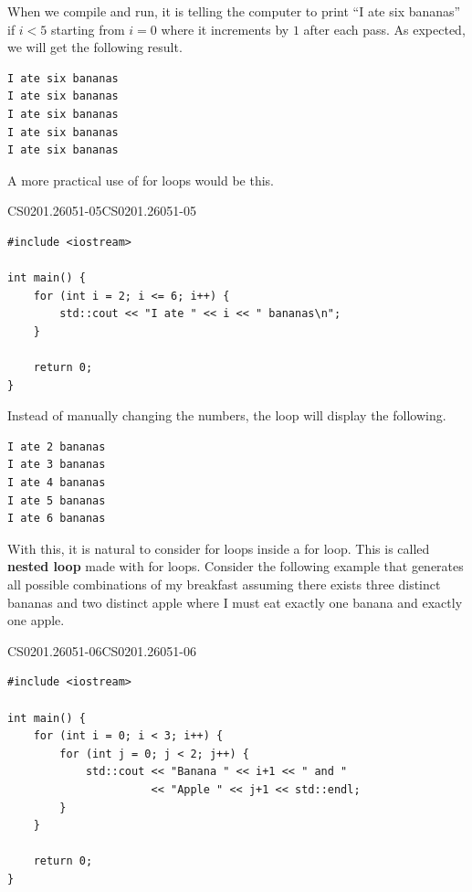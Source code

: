 \documentclass[../../../main.tex]{subfiles}
\begin{document}
When we compile and run, it is telling the computer to print
``I ate six bananas'' if $i < 5$ starting from $i = 0$ where it
increments by $1$ after each pass. As expected, we will get the
following result.

\begin{outputbox}
\begin{lstlisting}[style=basic]
I ate six bananas
I ate six bananas
I ate six bananas
I ate six bananas
I ate six bananas
\end{lstlisting}
\end{outputbox}

A more practical use of for loops would be this.

\begin{cppbox}{CS0201.26051-05}{CS0201.26051-05}
\begin{lstlisting}[style=cppstyle]
#include <iostream>

int main() {
    for (int i = 2; i <= 6; i++) {
        std::cout << "I ate " << i << " bananas\n";
    }

    return 0;
}
\end{lstlisting}
\end{cppbox}

Instead of manually changing the numbers, the loop will display
the following.

\begin{outputbox}
\begin{lstlisting}[style=basic]
I ate 2 bananas
I ate 3 bananas
I ate 4 bananas
I ate 5 bananas
I ate 6 bananas
\end{lstlisting}
\end{outputbox}

With this, it is natural to consider for loops inside a for loop.
This is called \textbf{nested loop} made with for loops. Consider
the following example that generates all possible combinations of
my breakfast assuming there exists three distinct bananas and
two distinct apple where I must eat exactly one banana and exactly
one apple.

\begin{cppbox}{CS0201.26051-06}{CS0201.26051-06}
\begin{lstlisting}[style=cppstyle]
#include <iostream>

int main() {
    for (int i = 0; i < 3; i++) {
        for (int j = 0; j < 2; j++) {
            std::cout << "Banana " << i+1 << " and "
                      << "Apple " << j+1 << std::endl;
        }
    }

    return 0;
}
\end{lstlisting}
\end{cppbox}
\end{document}
